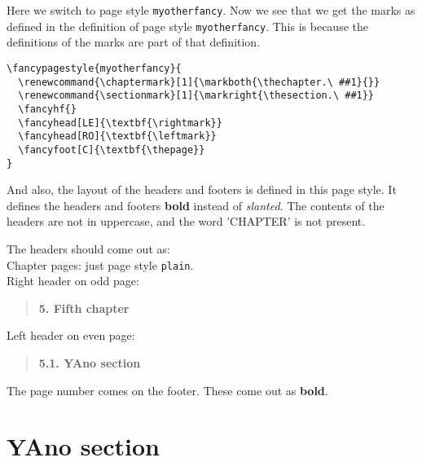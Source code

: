 \documentclass[openany]{book}
\renewcommand{\chaptermark}[1]{\markboth{\thechapter.\ #1}{}}
\renewcommand{\sectionmark}[1]{\markright{\thesection.\ #1}}
\renewcommand{\chaptermark}[1]{\markboth{\thechapter.
      \MakeUppercase{##1}}{}}
\renewcommand{\sectionmark}[1]{\markright{\thesection.
      \MakeUppercase{##1}}}
\renewcommand{\chaptermark}[1]{\markboth{\thechapter.\ ##1}{}}
\renewcommand{\sectionmark}[1]{\markright{\thesection.\ ##1}}
\begin{document}
\noindent
\begin{boxedminipage}{\textwidth}
Here we switch to page style \texttt{myotherfancy}.
Now we see that we get the marks as defined in the definition of page style \texttt{myotherfancy}.
This is because the definitions of the marks are  part of that definition.
\begin{verbatim}
\fancypagestyle{myotherfancy}{
  \renewcommand{\chaptermark}[1]{\markboth{\thechapter.\ ##1}{}}
  \renewcommand{\sectionmark}[1]{\markright{\thesection.\ ##1}}
  \fancyhf{}
  \fancyhead[LE]{\textbf{\rightmark}}
  \fancyhead[RO]{\textbf{\leftmark}}
  \fancyfoot[C]{\textbf{\thepage}}
}
\end{verbatim}
And also, the layout of the headers and footers is  defined in this page style. It defines the headers and footers \textbf{bold} instead of \textsl{slanted}.
The contents of the headers are not in uppercase, and the word 'CHAPTER' is not present.

The headers should come out as:
\\
Chapter pages: just page style \texttt{plain}.
\\
Right header on odd page:
\begin{quote}
  \textbf{5. Fifth chapter}
\end{quote}
Left header on even page:
\begin{quote}
  \textbf{5.1. YAno section}
\end{quote}
The page number comes on the footer.
These come out as \textbf{bold}.
\end{boxedminipage}
\bigskip

\lipsum[1]

\section{YAno section}

\lipsum
\end{document}
